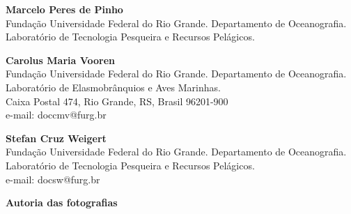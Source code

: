 \documentclass[a4paper,11pt,twoside,showtrims,onecolumn,openright,final]{memoir}
\begin{document}
\begin{scriptsize}
\begin{flushleft}
\textbf{Marcelo Peres de Pinho} \\
\vspace{1pt}
Fundação Universidade Federal do Rio Grande.
Departamento de Oceanografia.
Laboratório de Tecnologia Pesqueira e Recursos Pelágicos.

\textbf{Carolus Maria Vooren} \\
\vspace{1pt}
Fundação Universidade Federal do Rio Grande.
Departamento de Oceanografia.
Laboratório de Elasmobrânquios e Aves Marinhas. \\ 
Caixa Postal 474, Rio Grande, RS, Brasil 96201-900 \\
e-mail: doccmv@furg.br

\textbf{Stefan Cruz Weigert} \\
\vspace{1pt}
Fundação Universidade Federal do Rio Grande.
Departamento de Oceanografia.
Laboratório de Tecnologia Pesqueira e Recursos Pelágicos. \\
e-mail: docsw@furg.br

\end{flushleft}
\end{scriptsize}

\newpage
\onecolumn

\thispagestyle{empty}

\begin{center}
\LARGE \bfseries
Autoria das fotografias
\end{center}
\vspace{1cm}
\end{document}
